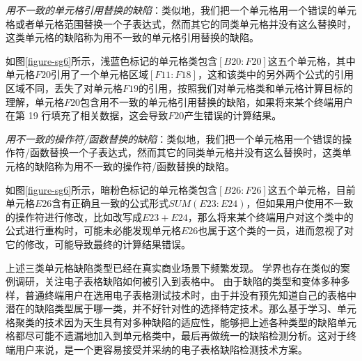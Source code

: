 \begin{definition}
    \textit{用不一致的单元格引用替换的缺陷}：类似地，我们把一个单元格用一个错误的单元格或者单元格范围替换一个子表达式，然而其它的同类单元格并没有这么替换时，这类单元格的缺陷称为用不一致的单元格引用替换的缺陷。
\end{definition}

如图\ref{figure-sg6}所示，浅蓝色标记的单元格类包含$[B20:F20]$这五个单元格，其中单元格$F20$引用了一个单元格区域$[F11:F18]$，这和该类中的另外两个公式的引用区域不同，丢失了对单元格$F19$的引用，按照我们对单元格类和单元格计算目标的理解，单元格$F20$包含用不一致的单元格引用替换的缺陷，如果将来某个终端用户在第 19 行填充了相关数据，这会导致$F20$产生错误的计算结果。

\begin{definition}
    \textit{用不一致的操作符/函数替换的缺陷}：类似地，我们把一个单元格用一个错误的操作符/函数替换一个子表达式，然而其它的同类单元格并没有这么替换时，这类单元格的缺陷称为用不一致的操作符/函数替换的缺陷。
\end{definition}
如图\ref{figure-sg6}所示，暗粉色标记的单元格类包含$[B26:F26]$这五个单元格，目前单元格$E26$含有正确且一致的公式形式$SUM(E23:E24)$，但如果用户使用不一致的操作符进行修改，比如改写成$E23 + E24$，那么将来某个终端用户对这个类中的公式进行重构时，可能未必能发现单元格$E26$也属于这个类的一员，进而忽视了对它的修改，可能导致最终的计算结果错误。


上述三类单元格缺陷类型已经在真实商业场景下频繁发现\cite{panko2006facing,powell2008critical}。
学界也存在类似的案例调研，关注电子表格缺陷如何被引入到表格中\cite{dou2014spreadsheet}。
由于缺陷的类型和变体多种多样，普通终端用户在选用电子表格测试技术时，由于并没有预先知道自己的表格中潜在的缺陷类型属于哪一类，并不好针对性的选择特定技术。那么基于学习、单元格聚类的技术因为天生具有对多种缺陷的适应性，能够把上述各种类型的缺陷单元格都尽可能不遗漏地加入到单元格类中，最后再做统一的缺陷检测分析。这对于终端用户来说，是一个更容易接受并采纳的电子表格缺陷检测技术方案。
